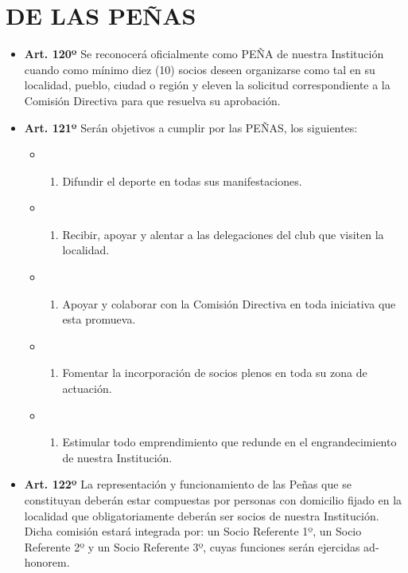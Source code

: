 \documentclass[]{book}
\providecommand{\tightlist}{%
  \setlength{\itemsep}{0pt}\setlength{\parskip}{0pt}}
\begin{document}
\chapter{DE LAS PEÑAS}\label{de-las-penas}

\begin{itemize}
\item
  \textbf{Art. 120º} Se reconocerá oficialmente como PEÑA de nuestra
  Institución cuando como mínimo diez (10) socios deseen organizarse
  como tal en su localidad, pueblo, ciudad o región y eleven la
  solicitud correspondiente a la Comisión Directiva para que resuelva su
  aprobación.
\item
  \textbf{Art. 121º} Serán objetivos a cumplir por las PEÑAS, los
  siguientes:

  \begin{itemize}
  \item
    \begin{enumerate}
    \def\labelenumi{\alph{enumi})}
    \tightlist
    \item
      Difundir el deporte en todas sus manifestaciones.
    \end{enumerate}
  \item
    \begin{enumerate}
    \def\labelenumi{\alph{enumi})}
    \setcounter{enumi}{1}
    \tightlist
    \item
      Recibir, apoyar y alentar a las delegaciones del club que visiten
      la localidad.
    \end{enumerate}
  \item
    \begin{enumerate}
    \def\labelenumi{\alph{enumi})}
    \setcounter{enumi}{2}
    \tightlist
    \item
      Apoyar y colaborar con la Comisión Directiva en toda iniciativa
      que esta promueva.
    \end{enumerate}
  \item
    \begin{enumerate}
    \def\labelenumi{\alph{enumi})}
    \setcounter{enumi}{3}
    \tightlist
    \item
      Fomentar la incorporación de socios plenos en toda su zona de
      actuación.
    \end{enumerate}
  \item
    \begin{enumerate}
    \def\labelenumi{\alph{enumi})}
    \setcounter{enumi}{4}
    \tightlist
    \item
      Estimular todo emprendimiento que redunde en el engrandecimiento
      de nuestra Institución.
    \end{enumerate}
  \end{itemize}
\item
  \textbf{Art. 122º} La representación y funcionamiento de las Peñas que
  se constituyan deberán estar compuestas por personas con domicilio
  fijado en la localidad que obligatoriamente deberán ser socios de
  nuestra Institución. Dicha comisión estará integrada por: un Socio
  Referente 1º, un Socio Referente 2º y un Socio Referente 3º, cuyas
  funciones serán ejercidas ad-honorem.
\end{itemize}
\end{document}
